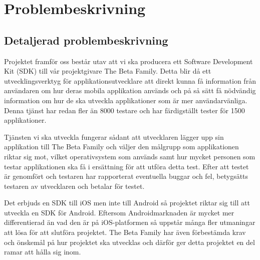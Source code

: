 \section{Problembeskrivning}
\subsection{Detaljerad problembeskrivning}
Projektet framför oss består utav att vi ska producera ett Software Development Kit (SDK) till vår projektgivare The Beta Family. Detta blir då ett utvecklingsverktyg för applikationsutvecklare att direkt kunna få information från användaren om hur deras mobila applikation används och på så sätt få nödvändig information om hur de ska utveckla applikationer som är mer användarvänliga. Denna tjänst har redan fler än 8000 testare och har färdigställt tester för 1500 applikationer.


Tjänsten vi ska utveckla fungerar sådant att utvecklaren lägger upp sin applikation till The Beta Family och väljer den målgrupp som applikationen riktar sig mot, vilket operativsystem som används samt hur mycket personen som testar applikationen ska få i ersättning för att utföra detta test. Efter att testet är genomfört och testaren har rapporterat eventuella buggar och fel, betygsätts testaren av utvecklaren och betalar för testet.


Det erbjuds en SDK till iOS men inte till Android så projektet riktar sig till att utveckla en SDK för Android. Eftersom Androidmarknaden är mycket mer differentierad än vad den är på iOS-platformen så uppstår många fler utmaningar att lösa för att slutföra projektet. The Beta Family har även förbestämda krav och önskemål på hur projektet ska utvecklas och därför ger detta projektet en del ramar att hålla sig inom.


